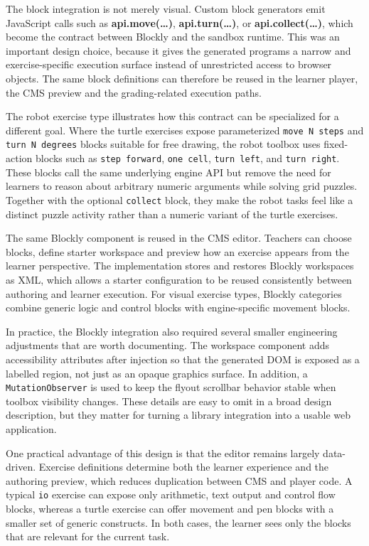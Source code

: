 The block integration is not merely visual. Custom block generators emit JavaScript calls such as
\textbf{api.move(\dots)}, \textbf{api.turn(\dots)}, or \textbf{api.collect(\dots)}, which become
the contract between Blockly and the sandbox runtime. This was an important design choice,
because it gives the generated programs a narrow and exercise-specific execution surface
instead of unrestricted access to browser objects.
The same block definitions can therefore be reused in the learner player, the CMS preview and
the grading-related execution paths.

The robot exercise type illustrates how this contract can be specialized for a different goal.
Where the turtle exercises expose parameterized \texttt{move N steps} and \texttt{turn N degrees}
blocks suitable for free drawing, the robot toolbox uses fixed-action blocks such as
\texttt{step forward}, \texttt{one cell}, \texttt{turn left}, and \texttt{turn right}.
These blocks call the same underlying engine API but remove the need for learners to reason
about arbitrary numeric arguments while solving grid puzzles.
Together with the optional \texttt{collect} block, they make the robot tasks
feel like a distinct puzzle activity rather than a numeric variant of the turtle exercises.

The same Blockly component is reused in the CMS editor.
Teachers can choose blocks, define starter workspace and preview how an exercise appears
from the learner perspective. The implementation stores and restores Blockly workspaces as
XML, which allows a starter configuration to be reused consistently between authoring and learner
execution. For visual exercise types, Blockly categories combine generic logic and
control blocks with engine-specific movement blocks.

In practice, the Blockly integration also required several smaller engineering adjustments
that are worth documenting. The workspace component adds
accessibility attributes after injection so that the generated DOM is exposed as a labelled region,
not just as an opaque graphics surface.
In addition, a \texttt{MutationObserver} is used to keep the flyout scrollbar behavior stable when toolbox
visibility changes. These details are easy to omit in a broad design description,
but they matter for turning a library integration into a usable web application.

One practical advantage of this design is that the editor remains largely data-driven.
Exercise definitions determine both the learner experience and the authoring preview, which reduces
duplication between CMS and player code.
A typical \texttt{io} exercise can expose only arithmetic, text output and control
flow blocks, whereas a turtle exercise can offer movement and pen blocks with a
smaller set of generic constructs. In both cases, the learner sees only the
blocks that are relevant for the current task.

